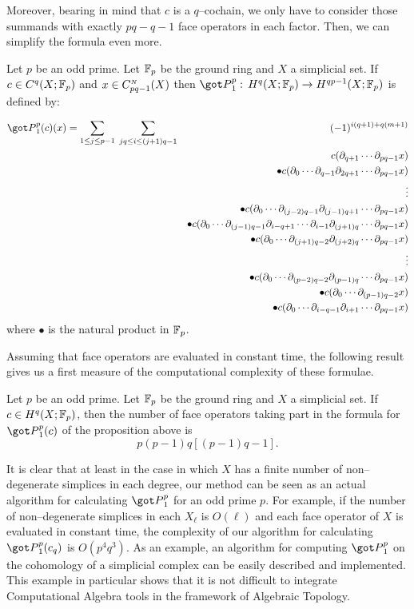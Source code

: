 Moreover, bearing in mind that $c$ is a $q$--cochain,  we only have to
consider those summands with exactly $pq-q-1$ face operators in each factor.
Then, we can simplify the formula even more.


\begin{prp}\label{prop}
Let $p$ be an odd prime. Let ${\Bbb F}_p$ be the ground ring
and $X$ a simplicial set. If $c\in C^q(X;{\Bbb F}_p)$
and $x\in C_{pq-1}^{\scriptscriptstyle N}(X)$ then
${\got P}_1^p:\, H^q(X;\Fp)\ra H^{qp-1}(X;\Fp)$ is defined
by:

\begin{eqnarray*}
{\got P}_1^p(c)(x)=\sum_{1\leq j\leq p-1}\;\sum_{jq\leq i\leq (j+1)q-1}&&
(-1)^{i(q+1)+q(m+1)}\\
&&c(\pa_{q+1}\cdots\pa_{pq-1}x)\\
&&\bullet c(\pa_0\cdots\pa_{q-1}\pa_{2q+1}\cdots\pa_{pq-1}x)\\
&&\vdots\\
&&\bullet c(\pa_0\cdots\pa_{(j-2)q-1}\pa_{(j-1)q+1}\cdots\pa_{pq-1}x)\\
&&\bullet c(\pa_0\cdots\pa_{(j-1)q-1}\pa_{i-q+1}\cdots\pa_{i-1}
\pa_{(j+1)q}\cdots\pa_{pq-1}x)\\
&&\bullet c(\pa_0\cdots\pa_{(j+1)q-2}\pa_{(j+2)q}\cdots\pa_{pq-1}x)\\
&&\vdots\\
&&\bullet c(\pa_0\cdots\pa_{(p-2)q-2}\pa_{(p-1)q}\cdots\pa_{pq-1}x)\\
&&\bullet c(\pa_0\cdots\pa_{(p-1)q-2}x)\\
&&\bullet c(\pa_0\cdots\pa_{i-q-1}\pa_{i+1}\cdots\pa_{pq-1}x)
\end{eqnarray*}
where $\bullet$ is the natural product in ${\Bbb F}_p$.
\end{prp}

Assuming that face operators are evaluated in constant time, the following
result gives us a first measure of the computational complexity of these
formulae.

\begin{prp}
Let $p$ be an odd prime. Let ${\Bbb F}_p$ be the ground ring and $X$ a simplicial
set. If $c\in H^q(X;{\Bbb F}_p)$, then the number of face
operators taking part in the formula for ${\got P}_1^p(c)$ of the
proposition above is
$$p(p-1)q[(p-1)q-1].$$
\end{prp}


It is clear that at least in the case in which $X$ has a finite number of
non--degenerate simplices in each degree, our method can be seen as an actual
algorithm for calculating ${\got P}_1^p$ for an odd prime $p$. For example,
if the number of non--degenerate simplices in each $X_{\ell}$ is
$O(\ell)$ and each face operator of $X$ is evaluated in constant time,
the complexity of our algorithm for calculating ${\got P}_1^p(c_q)$ is
$O(p^4q^3)$. As an example, an
 algorithm for computing ${\got P}_1^{p}$
on the cohomology of a simplicial complex
\cite{Mun84, Wei94}
can be easily described and implemented. This example in particular shows that it is not
difficult to integrate Computational Algebra tools in the
framework of Algebraic Topology.

